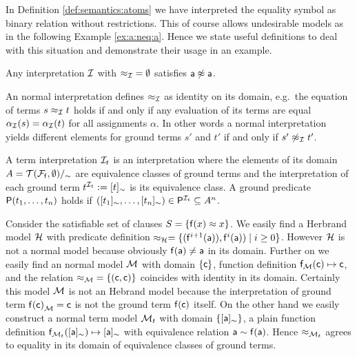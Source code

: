 In Definition \ref{def:semantics:atoms} we have interpreted the equality symbol as binary relation without restrictions.
This of course allows undesirable models as in the following Example \ref{ex:a:neq:a}.
Hence we state useful definitions to deal with this situation and demonstrate their usage in an example. 

\begin{example}
	\label{ex:a:neq:a}
	Any interpretation ${\mathcal I}$  
	with ${\approx_{\mathcal I}} = \emptyset$ satisfies ${\mathsf a}\not\approx{\mathsf a}$.
\end{example}

\begin{definition}\label{def:normal:interpreation}
	An {\myem normal} interpretation defines $\approx_{\mathcal I}$ as identity on its domain,
	e.g.~the equation of terms $s \approx_{\mathcal I} t$ holds if and only 
	if any evaluation of its terms are equal $\alpha_{\mathcal I}(s) = \alpha_{\mathcal I}(t)$ 
	for all assignments $\alpha$. 
	In other words a normal interpretation yields different elements 
	for ground terms $s'$ and $t'$ if and only if $s'\not\approx_{\mathcal I} t'$.
\end{definition}

\begin{definition}
	A {\myem term interpretation} 
	${\mathcal I}_t$ 
	is an interpretation 
	where the elements of its domain $A = {{\mathcal T}({\mathcal F}_{\mathsf f},\emptyset)}/_\sim$ 
	are equivalence classes of ground terms
	and the interpretation of each ground term $t^{{\mathcal I}_t} := [t]_\sim$ is its equivalence class.
	A ground predicate ${\mathsf P}(t_1,\ldots,t_n)$ holds if 
	$([t_1]_\sim,\ldots,[t_n]_\sim) \in {\mathsf P}^{{\mathcal I}_t} \subseteq A^n$.
\end{definition}


\begin{example}
	Consider the satisfiable set of clauses $S = \{ {\mathsf f}(x) \approx x \}$. 
	We easily find a Herbrand model ${\mathcal H}$ with
	predicate definition $\approx_{\mathcal H} = \{ ({\mathsf f}^{i+1}({\mathsf a})), {\mathsf f}^{i}({\mathsf a})) \mid i\geq 0  \} $. 
	However ${\mathcal H}$ is not a normal model because obviously ${\mathsf f}({\mathsf a})\neq{\mathsf a}$ in its domain.
	Further on we easily find an normal model ${\mathcal M}$ 
	with domain $\{ {\mathsf c} \}$, function definition ${\mathsf f}_{\mathcal M}({\mathsf c}) \mapsto {\mathsf c}$, 
	and the relation ${\approx_{\mathcal M}} = \{ ({\mathsf c},{\mathsf c})\}$ coincides with identity in its domain.
	Certainly this model ${\mathcal M}$ is not an Hebrand model 
	because the interpretation of ground term ${{\mathsf f}({\mathsf c})}_{\mathcal M} = {\mathsf c}$ is not the ground term ${\mathsf f}({\mathsf c})$ itself.
	On the other hand we easily construct a normal term model ${\mathcal M}_t$ with domain $\{ [{\mathsf a}]_\sim\}$, 
	a plain function definition
	${\mathsf f}_{{\mathcal M}_t}([{\mathsf a}]_\sim) \mapsto [{\mathsf a}]_\sim$ 
	with equivalence relation
	${\mathsf a} \sim {\mathsf f}({\mathsf a})$.
	Hence $\approx_{{\mathcal M}_t}$ agrees to equality in its domain of equivalence classes of ground terms.	
\end{example}

